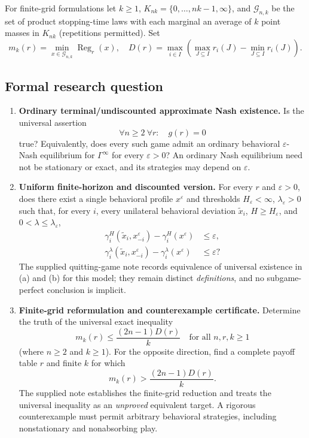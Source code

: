 \documentclass[11pt,a4paper]{article}
\begin{document}
For finite-grid formulations let $k\ge1$,
$K_{nk}=\{0,\ldots,nk-1,\infty\}$, and $\mathcal G_{n,k}$ be the
set of product stopping-time laws with each marginal an average of
$k$ point masses in $K_{nk}$ (repetitions permitted). Set
\[
m_k(r)=\min_{x\in\mathcal G_{n,k}}\operatorname{Reg}_r(x),\quad
D(r)=\max_{i\in I}\left(\max_{J\subseteq I}r_i(J)
-\min_{J\subseteq I}r_i(J)\right).
\]

\subsection*{Formal research question}

\begin{enumerate}[label=\textbf{(\alph*)},leftmargin=2.5em]
	\item \textbf{Ordinary terminal/undiscounted approximate Nash existence.}
	Is the universal assertion
	\[
	\boxed{\quad \forall n\ge2\ \forall r:\quad
		g(r)=0\quad}
	\]
	true? Equivalently, does every such game admit an ordinary behavioral
	$\varepsilon$-Nash equilibrium for $\Gamma^\infty$ for every
	$\varepsilon>0$? An ordinary Nash equilibrium need not be stationary
	or exact, and its strategies may depend on $\varepsilon$.
	
	\item \textbf{Uniform finite-horizon and discounted version.}
	For every $r$ and $\varepsilon>0$, does there exist a single
	behavioral profile $x^\varepsilon$ and thresholds
	$H_\varepsilon<\infty$, $\lambda_\varepsilon>0$ such that, for every
	$i$, every unilateral behavioral deviation $\widetilde x_i$,
	$H\ge H_\varepsilon$, and $0<\lambda\le\lambda_\varepsilon$,
	\[
	\begin{aligned}
		\gamma_i^H(\widetilde x_i,x_{-i}^\varepsilon)
		-\gamma_i^H(x^\varepsilon)&\le\varepsilon,\\
		\gamma_i^\lambda(\widetilde x_i,x_{-i}^\varepsilon)
		-\gamma_i^\lambda(x^\varepsilon)&\le\varepsilon?
	\end{aligned}
	\]
	The supplied quitting-game note records equivalence of universal
	existence in (a) and (b) for this model; they remain distinct
	\emph{definitions}, and no subgame-perfect conclusion is implicit.
	
	\item \textbf{Finite-grid reformulation and counterexample certificate.}
	Determine the truth of the universal exact inequality
	\[
	\boxed{\quad
		m_k(r)\le\frac{(2n-1)D(r)}{k}
		\quad\text{for all }n,r,k\ge1\quad}
	\]
	(where $n\ge2$ and $k\ge1$). For the opposite direction, find a
	complete payoff table $r$ and finite $k$ for which
	\[
	m_k(r)>\frac{(2n-1)D(r)}{k}.
	\]
	The supplied note establishes the finite-grid reduction and treats
	the universal inequality as an \emph{unproved} equivalent target.
	A rigorous counterexample must permit arbitrary behavioral
	strategies, including nonstationary and nonabsorbing play.
	

\end{enumerate}
\end{document}
